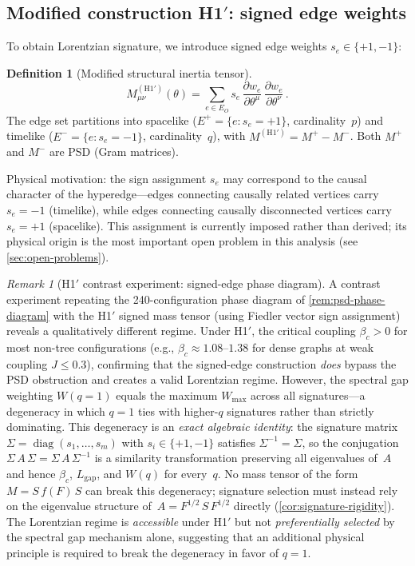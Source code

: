 \documentclass[11pt]{article}
\theoremstyle{definition}
\newtheorem{definition}[theorem]{Definition}
\theoremstyle{remark}
\newtheorem{remark}[theorem]{Remark}
\begin{document}
\subsection{Modified construction H1$'$: signed edge weights}
\label{sec:H1-prime}

To obtain Lorentzian signature, we introduce signed edge weights
$s_e \in \{+1, -1\}$:

\begin{definition}[Modified structural inertia tensor]
\label{def:H1-prime}
\begin{equation}
\label{eq:H1-prime}
M^{(\mathrm{H1'})}_{\mu\nu}(\theta) = \sum_{e \in E_O}
s_e\, \frac{\partial w_e}{\partial \theta^\mu}\,
\frac{\partial w_e}{\partial \theta^\nu}\,.
\end{equation}
The edge set partitions into spacelike ($E^+ = \{e : s_e = +1\}$,
cardinality~$p$) and timelike ($E^- = \{e : s_e = -1\}$,
cardinality~$q$), with $M^{(\mathrm{H1'})} = M^+ - M^-$.
Both $M^+$ and $M^-$ are PSD (Gram matrices).
\end{definition}

Physical motivation: the sign assignment $s_e$ may correspond to the
causal character of the hyperedge---edges connecting causally related
vertices carry $s_e = -1$ (timelike), while edges connecting causally
disconnected vertices carry $s_e = +1$ (spacelike).
This assignment is currently imposed rather than derived; its
physical origin is the most important open problem in this analysis
(see \cref{sec:open-problems}).

\begin{remark}[H1$'$ contrast experiment: signed-edge phase diagram]
\label{rem:signed-edge-phase-diagram}
A contrast experiment repeating the 240-configuration phase diagram
of \cref{rem:psd-phase-diagram} with the H1$'$ signed mass tensor
(using Fiedler vector sign assignment) reveals a qualitatively
different regime.
Under H1$'$, the critical coupling $\beta_c > 0$ for most
non-tree configurations (e.g., $\beta_c \approx 1.08$--$1.38$
for dense graphs at weak coupling $J \leq 0.3$), confirming that
the signed-edge construction \emph{does} bypass the PSD obstruction
and creates a valid Lorentzian regime.
However, the spectral gap weighting $W(q{=}1)$ equals the maximum
$W_{\mathrm{max}}$ across all signatures---a degeneracy in which
$q = 1$ ties with higher-$q$ signatures rather than strictly
dominating.
This degeneracy is an \emph{exact algebraic identity}: the signature
matrix $\Sigma = \operatorname{diag}(s_1, \ldots, s_m)$ with
$s_i \in \{+1, -1\}$ satisfies $\Sigma^{-1} = \Sigma$, so the
conjugation $\Sigma\, A\, \Sigma = \Sigma\, A\, \Sigma^{-1}$ is a
similarity transformation preserving all eigenvalues of~$A$ and hence
$\beta_c$, $L_{\mathrm{gap}}$, and $W(q)$ for every~$q$.
No mass tensor of the form $M = S\, f(F)\, S$ can break this
degeneracy; signature selection must instead rely on the eigenvalue
structure of~$A = F^{1/2}\, S\, F^{1/2}$ directly
(\cref{cor:signature-rigidity}).
The Lorentzian regime is \emph{accessible} under H1$'$ but not
\emph{preferentially selected} by the spectral gap mechanism alone,
suggesting that an additional physical principle is required to
break the degeneracy in favor of $q = 1$.
\end{remark}
\end{document}
